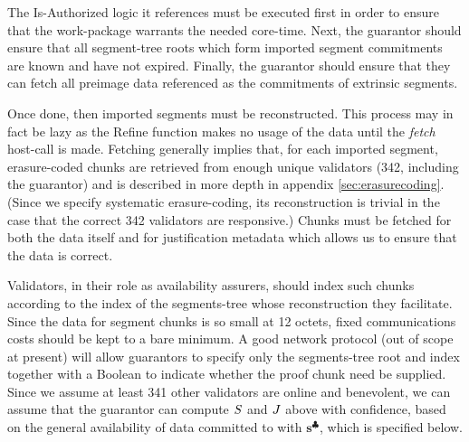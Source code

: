 The Is-Authorized logic it references must be executed first in order to ensure that the work-package warrants the needed core-time. Next, the guarantor should ensure that all segment-tree roots which form imported segment commitments are known and have not expired. Finally, the guarantor should ensure that they can fetch all preimage data referenced as the commitments of extrinsic segments.

Once done, then imported segments must be reconstructed. This process may in fact be lazy as the Refine function makes no usage of the data until the \emph{fetch} host-call is made. Fetching generally implies that, for each imported segment, erasure-coded chunks are retrieved from enough unique validators (342, including the guarantor) and is described in more depth in appendix \ref{sec:erasurecoding}. (Since we specify systematic erasure-coding, its reconstruction is trivial in the case that the correct 342 validators are responsive.) Chunks must be fetched for both the data itself and for justification metadata which allows us to ensure that the data is correct.

Validators, in their role as availability assurers, should index such chunks according to the index of the segments-tree whose reconstruction they facilitate. Since the data for segment chunks is so small at 12 octets, fixed communications costs should be kept to a bare minimum. A good network protocol (out of scope at present) will allow guarantors to specify only the segments-tree root and index together with a Boolean to indicate whether the proof chunk need be supplied. Since we assume at least 341 other validators are online and benevolent, we can assume that the guarantor can compute $S$ and $J$ above with confidence, based on the general availability of data committed to with $\mathbf{s}^\clubsuit$, which is specified below.

